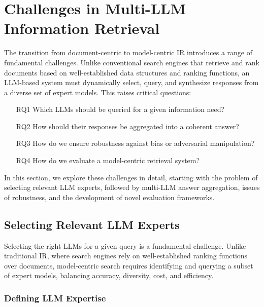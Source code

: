 \section{Challenges in Multi-LLM Information Retrieval}
\label{sec:challenges}

The transition from document-centric to model-centric IR introduces a range of fundamental challenges. Unlike conventional search engines that retrieve and rank documents based on well-established data structures and ranking functions, an LLM-based system must dynamically select, query, and synthesize responses from a diverse set of expert models. This raises critical questions:
\begin{itemize}
    \item[RQ1] Which LLMs should be queried for a given information need? 
    \item[RQ2] How should their responses be aggregated into a coherent answer? 
    \item[RQ3] How do we ensure robustness against bias or adversarial manipulation? 
    \item[RQ4] How do we evaluate a model-centric retrieval system?
\end{itemize}

In this section, we explore these challenges in detail, starting with the problem of selecting relevant LLM experts, followed by multi-LLM answer aggregation, issues of robustness, and the development of novel evaluation frameworks.

\subsection{Selecting Relevant LLM Experts}
Selecting the right LLMs for a given query is a fundamental challenge. Unlike traditional IR, where search engines rely on well-established ranking functions over documents, model-centric search requires identifying and querying a subset of expert models, balancing accuracy, diversity, cost, and efficiency.

\subsubsection{Defining LLM Expertise}

